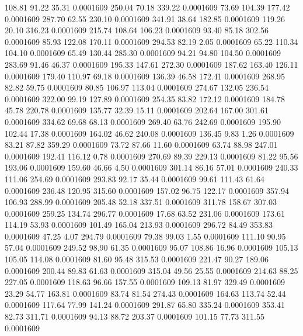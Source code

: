  108.81   91.22   35.31   0.0001609
 250.04   70.18  339.22   0.0001609
  73.69  104.39  177.42   0.0001609
 287.70   62.55  230.10   0.0001609
 341.91   38.64  182.85   0.0001609
 119.26   20.10  316.23   0.0001609
 215.74  108.64  106.23   0.0001609
  93.40   85.18  302.56   0.0001609
  85.93  122.08  170.11   0.0001609
 294.53   82.19    2.05   0.0001609
  65.22  110.34  104.10   0.0001609
  65.49  130.44  285.30   0.0001609
  94.21   94.80  104.50   0.0001609
 283.69   91.46   46.37   0.0001609
 195.33  147.61  272.30   0.0001609
 187.62  163.40  126.11   0.0001609
 179.40  110.97   69.18   0.0001609
 136.39   46.58  172.41   0.0001609
 268.95   82.82   59.75   0.0001609
  80.85  106.97  113.04   0.0001609
 274.67  132.05  236.54   0.0001609
 322.00   99.19  127.89   0.0001609
 254.35   83.82  172.12   0.0001609
 184.78   45.78  220.78   0.0001609
 135.77   32.39   15.11   0.0001609
 202.64  167.00  301.61   0.0001609
 334.62   69.68   68.13   0.0001609
 269.40   63.76  242.69   0.0001609
 195.90  102.44   17.38   0.0001609
 164.02   46.62  240.08   0.0001609
 136.45    9.83    1.26   0.0001609
  83.21   87.82  359.29   0.0001609
  73.72   87.66   11.60   0.0001609
  63.74   88.98  247.01   0.0001609
 192.41  116.12    0.78   0.0001609
 270.69   89.39  229.13   0.0001609
  81.22   95.56  193.06   0.0001609
 159.60   46.66    4.50   0.0001609
 301.14   86.16   57.01   0.0001609
 240.33  111.06  254.69   0.0001609
 293.83   92.17   35.44   0.0001609
  99.61  111.43   61.64   0.0001609
 236.48  120.95  315.60   0.0001609
 157.02   96.75  122.17   0.0001609
 357.94  106.93  288.99   0.0001609
 205.48   52.18  337.51   0.0001609
 311.78  158.67  307.03   0.0001609
 259.25  134.74  296.77   0.0001609
  17.68   63.52  231.06   0.0001609
 173.61  114.19   53.93   0.0001609
 101.49  165.04  213.93   0.0001609
 296.72   84.49  353.83   0.0001609
  47.25    4.07  294.79   0.0001609
  79.38   99.03    1.55   0.0001609
 111.10   90.95   57.04   0.0001609
 249.52   98.90   61.35   0.0001609
  95.07  108.86   16.96   0.0001609
 105.13  105.05  114.08   0.0001609
  81.60   95.48  315.53   0.0001609
 221.47   90.27  189.06   0.0001609
 200.44   89.83   61.63   0.0001609
 315.04   49.56   25.55   0.0001609
 214.63   88.25  227.05   0.0001609
 118.63   96.66  157.55   0.0001609
 109.13   81.97  329.49   0.0001609
  23.29   54.77  163.81   0.0001609
  83.74   81.54  274.43   0.0001609
 164.63  113.74   52.44   0.0001609
 117.64   77.99  141.24   0.0001609
 291.87   65.80  335.24   0.0001609
 353.41   82.73  311.71   0.0001609
  94.13   88.72  203.37   0.0001609
 101.15   77.73  311.55   0.0001609
